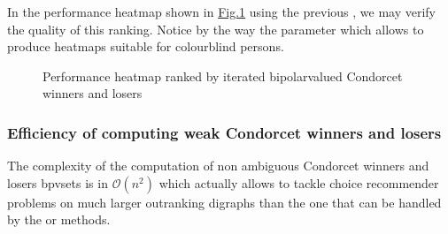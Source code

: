 \documentclass[a4paper,12pt,english]{sphinxhowto}
\let\sphinxpxdimen\pdfpxdimen\else\newdimen\sphinxpxdimen
\begin{document}
\begin{sphinxVerbatim}[commandchars=\\\{\}]
 
  
\end{sphinxVerbatim}

\sphinxAtStartPar
In the performance heatmap shown in \hyperref[\detokenize{pearls:condorcetwinnersheatmap}]{Fig.\@ \ref{\detokenize{pearls:condorcetwinnersheatmap}}} using the previous , we may verify the quality of this ranking. Notice by the way the  parameter which allows to produce heatmaps suitable for colourblind persons.

\begin{sphinxVerbatim}[commandchars=\\\{\}]
                             
                             
\end{sphinxVerbatim}

\begin{figure}[H]
\centering
\capstart

\noindent\sphinxincludegraphics[width=500\sphinxpxdimen]{{condorcetWinnersHeatmap}.png}
\caption{Performance heatmap ranked by iterated bipolar\sphinxhyphen{}valued Condorcet winners and losers}\label{\detokenize{pearls:condorcetwinnersheatmap}}\end{figure}


\subsubsection{Efficiency of computing weak Condorcet winners and losers}
\label{\detokenize{pearls:efficiency-of-computing-weak-condorcet-winners-and-losers}}
\sphinxAtStartPar
The complexity of the computation of non ambiguous Condorcet winners and losers bpv\sphinxhyphen{}sets is in \(\mathcal{O}(n^2)\) which actually allows to tackle choice recommender problems on much larger outranking digraphs than the one that can be handled by the  or  methods.
\end{document}
